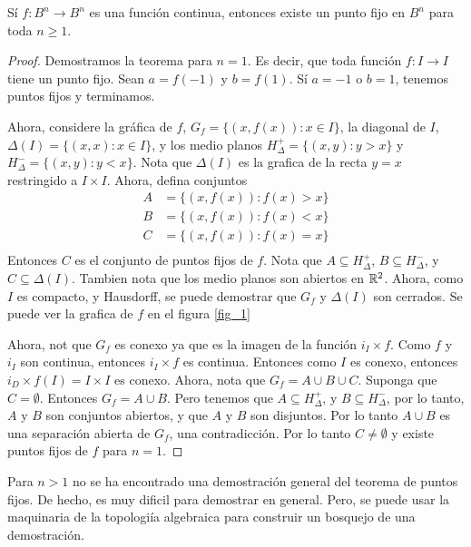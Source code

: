 \begin{theorem}\label{thm_1}
    S\'i $f:B^n \rightarrow B^n$ es una funci\'on continua, entonces existe un
    punto fijo en $B^n$ para toda $n \geq 1$.
\end{theorem}
\begin{proof}
    Demostramos la teorema para $n=1$. Es decir, que toda funci\'on  $f:I
    \rightarrow I$ tiene un punto fijo. Sean $a=f(-1)$ y $b=f(1)$. S\'i $a=-1$ o
    $b=1$, tenemos puntos fijos y terminamos.

    Ahora, considere la gr\'afica de $f$,  $G_f=\{(x,f(x)) : x \in I\}$, la
    diagonal de $I$, $\Delta(I)=\{(x,x) : x \in I\}$, y los medio planos
    $H^+_\Delta=\{(x,y) : y>x\}$ y $H^-_\Delta=\{(x,y) : y<x\}$. Nota que
    $\Delta(I)$ es la grafica de la recta $y=x$ restringido a $I \times I$.
    Ahora, defina conjuntos
    \begin{align*}
        A   &=      \{(x,f(x)) : f(x)>x\} \\
        B   &=      \{(x,f(x)) : f(x)<x\} \\
        C   &=      \{(x,f(x)) : f(x)=x\} \\
    \end{align*}
    Entonces $C$ es el conjunto de puntos fijos de $f$. Nota que $A \subseteq
    H^+_\Delta$,  $B \subseteq H^-_\Delta$, y $C \subseteq \Delta(I)$. Tambien
    nota que los medio planos son abiertos en
    $\mathbb{R}^2$. Ahora, como  $I$ es compacto, y Hausdorff, se puede demostrar que
    $G_f$ y  $\Delta(I)$ son cerrados. Se puede ver la grafica de $f$ en el
    figura \ref{fig_1}

    Ahora, not que $G_f$ es conexo ya que es la imagen de la funci\'on $i_I
    \times f$. Como  $f$ y  $i_I$ son continua, entonces  $i_I \times f$ es
    continua. Entonces como  $I$ es conexo, entonces $i_D \times f(I) = I \times
    I$ es conexo. Ahora, nota que $G_f=A \cup B \cup C$. Suponga que
    $C=\emptyset$. Entonces  $G_f=A \cup B$. Pero tenemos que $A \subseteq
    H^+_\Delta$, y $B \subseteq H^-_\Delta$, por lo tanto, $A$ y  $B$ son
    conjuntos abiertos, y que  $A$  y $B$ son disjuntos. Por lo tanto $A \cup B$
    es una separaci\'on abierta de  $G_f$, una contradicci\'on. Por lo tanto  $C
    \neq \emptyset$ y existe puntos fijos de  $f$ para $n=1$.
\end{proof}
\begin{remark}
    Para $n > 1$ no se ha encontrado una demostraci\'on general del teorema de
    puntos fijos. De hecho, es muy dificil para demostrar en general. Pero, se
    puede usar la maquinaria de la topologi\'ia algebraica para construir un
    bosquejo de una demostraci\'on.
\end{remark}

